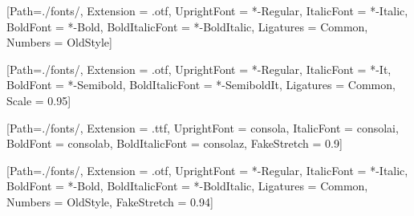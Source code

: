 
\usepackage{fontspec}
\usepackage{xltxtra}


[Path=./fonts/,
  Extension      = .otf,
  UprightFont    = *-Regular,
  ItalicFont     = *-Italic,
  BoldFont       = *-Bold,
  BoldItalicFont = *-BoldItalic,
  Ligatures      = Common,
  Numbers        = OldStyle]


\setsansfont{SourceSans3}[Path=./fonts/,
  Extension      = .otf,
  UprightFont    = *-Regular,
  ItalicFont     = *-It,
  BoldFont       = *-Semibold,
  BoldItalicFont = *-SemiboldIt,
  Ligatures      = Common,
  Scale          = 0.95]

\setmonofont{Consolas}[Path=./fonts/,
  Extension      = .ttf,
  UprightFont    = consola,
  ItalicFont     = consolai,
  BoldFont       = consolab,
  BoldItalicFont = consolaz,
  FakeStretch    = 0.9]


[Path=./fonts/,
  Extension      = .otf,
  UprightFont    = *-Regular,
  ItalicFont     = *-Italic,
  BoldFont       = *-Bold,
  BoldItalicFont = *-BoldItalic,
  Ligatures       = Common,
  Numbers         = OldStyle,
  FakeStretch     = 0.94]

